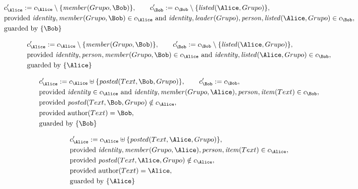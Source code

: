 \fi
\begin{align*}
&
c'_
{
\Alice
}
 := 
c_
{
\Alice
}
 \setminus 
\{
\mathit{
member
}
(
Grupo
,
\Bob
)
\}
, \qquad 
c'_
{
\Bob
}
 := 
c_
{
\Bob
}
 \setminus 
\{
\mathit{
listed
}
(
\Alice
,
Grupo
)
\}
,\\
&
\text{provided } 
\mathit{
identity
}
,
\mathit{
member
}
(
Grupo
,
\Bob
)
 \in c_
{
\Alice
}
 \text{ and } 
\mathit{
identity
}
,
\mathit{
leader
}
(
Grupo
)
,
\mathit{
person
}
,
\mathit{
listed
}
(
\Alice
,
Grupo
)
 \in c_
{
\Bob
}
,\\
&
\text{guarded by } \{
\Bob
\}
\end{align*}

\begin{align*}
&
c'_
{
\Alice
}
 := 
c_
{
\Alice
}
 \setminus 
\{
\mathit{
member
}
(
Grupo
,
\Bob
)
\}
, \qquad 
c'_
{
\Bob
}
 := 
c_
{
\Bob
}
 \setminus 
\{
\mathit{
listed
}
(
\Alice
,
Grupo
)
\}
,\\
&
\text{provided } 
\mathit{
identity
}
,
\mathit{
person
}
,
\mathit{
member
}
(
Grupo
,
\Bob
)
 \in c_
{
\Alice
}
 \text{ and } 
\mathit{
identity
}
,
\mathit{
listed
}
(
\Alice
,
Grupo
)
 \in c_
{
\Bob
}
,\\
&
\text{guarded by } \{
\Alice
\}
\end{align*}

\begin{align*}
&
c'_
{
\Alice
}
 := 
c_
{
\Alice
}
 \uplus 
\{
\mathit{
posted
}
(
Text
,
\Bob
,
Grupo
)
\}
, \qquad 
c'_
{
\Bob
}
 := 
c_
{
\Bob
}
,\\
&
\text{provided } 
\mathit{
identity
}
 \in c_
{
\Alice
}
 \text{ and } 
\mathit{
identity
}
,
\mathit{
member
}
(
Grupo
,
\Alice
)
,
\mathit{
person
}
,
\mathit{
item
}
(
Text
)
 \in c_
{
\Bob
}
,\\
&
\text{provided } 
\mathit{
posted
}
(
Text
,
\Bob
,
Grupo
)
 \notin c_
{
\Alice
}
,\\
&
\text{provided } 
\mathrm{author}(
Text
)
=
\Bob
,\\
&
\text{guarded by } \{
\Bob
\}
\end{align*}

\begin{align*}
&
c'_
{
\Alice
}
 := 
c_
{
\Alice
}
 \uplus 
\{
\mathit{
posted
}
(
Text
,
\Alice
,
Grupo
)
\}
,\\
&
\text{provided } 
\mathit{
identity
}
,
\mathit{
member
}
(
Grupo
,
\Alice
)
,
\mathit{
person
}
,
\mathit{
item
}
(
Text
)
 \in c_
{
\Alice
}
,\\
&
\text{provided } 
\mathit{
posted
}
(
Text
,
\Alice
,
Grupo
)
 \notin c_
{
\Alice
}
,\\
&
\text{provided } 
\mathrm{author}(
Text
)
=
\Alice
,\\
&
\text{guarded by } \{
\Alice
\}
\end{align*}
